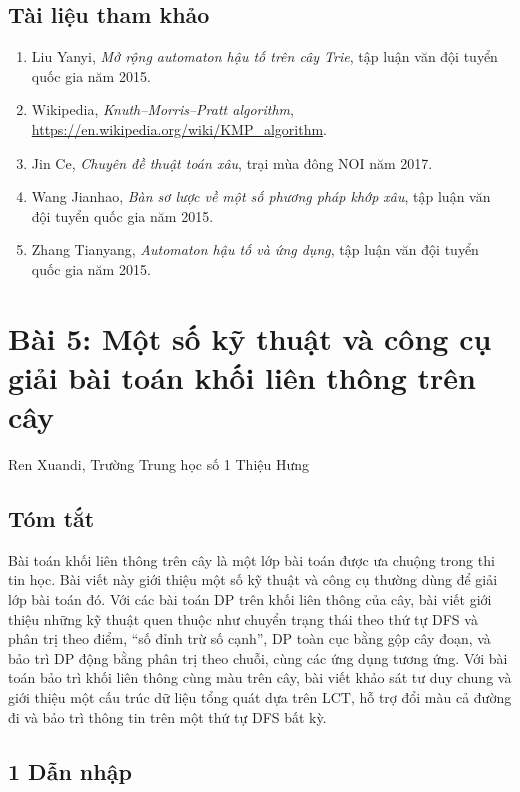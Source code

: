 \documentclass[11pt]{article}
\begin{document}
\subsection*{Tài liệu tham khảo}

\begin{enumerate}
  \item Liu Yanyi, \emph{Mở rộng automaton hậu tố trên cây Trie}, tập luận văn
  đội tuyển quốc gia năm 2015.
  \item Wikipedia, \emph{Knuth--Morris--Pratt algorithm},
  \url{https://en.wikipedia.org/wiki/KMP_algorithm}.
  \item Jin Ce, \emph{Chuyên đề thuật toán xâu}, trại mùa đông NOI năm 2017.
  \item Wang Jianhao, \emph{Bàn sơ lược về một số phương pháp khớp xâu}, tập
  luận văn đội tuyển quốc gia năm 2015.
  \item Zhang Tianyang, \emph{Automaton hậu tố và ứng dụng}, tập luận văn đội
  tuyển quốc gia năm 2015.
\end{enumerate}

\section{Bài 5: Một số kỹ thuật và công cụ giải bài toán khối liên thông trên cây}

\begin{center}
Ren Xuandi, Trường Trung học số 1 Thiệu Hưng
\end{center}

\subsection*{Tóm tắt}

Bài toán khối liên thông trên cây là một lớp bài toán được ưa chuộng trong thi
tin học. Bài viết này giới thiệu một số kỹ thuật và công cụ thường dùng để giải
lớp bài toán đó. Với các bài toán DP trên khối liên thông của cây, bài viết
giới thiệu những kỹ thuật quen thuộc như chuyển trạng thái theo thứ tự DFS và
phân trị theo điểm, ``số đỉnh trừ số cạnh'', DP toàn cục bằng gộp cây đoạn, và
bảo trì DP động bằng phân trị theo chuỗi, cùng các ứng dụng tương ứng. Với bài
toán bảo trì khối liên thông cùng màu trên cây, bài viết khảo sát tư duy chung
và giới thiệu một cấu trúc dữ liệu tổng quát dựa trên LCT, hỗ trợ đổi màu cả
đường đi và bảo trì thông tin trên một thứ tự DFS bất kỳ.

\subsection*{1 Dẫn nhập}
\end{document}
